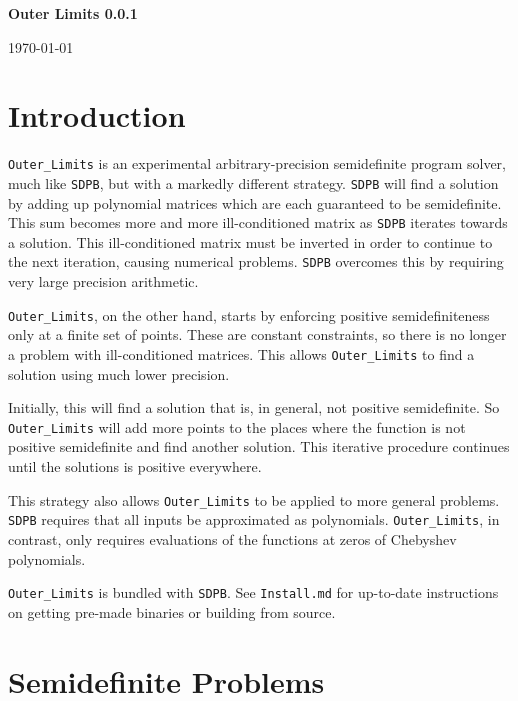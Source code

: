 \documentclass[12pt]{article}
\numberwithin{equation}{section}
\begin{document}
{\Large
\begin{center}
{\bf Outer Limits 0.0.1 \\\vspace{.1in}}
\end{center}
}
\begin{center}
\noindent \today
\end{center}
\tableofcontents
\section{Introduction}
\label{sec:introduction}

\texttt{Outer\_Limits} is an experimental arbitrary-precision
semidefinite program solver, much like \texttt{SDPB}, but with a
markedly different strategy.  \texttt{SDPB} will find a solution by
adding up polynomial matrices which are each guaranteed to be
semidefinite.  This sum becomes more and more ill-conditioned matrix
as \texttt{SDPB} iterates towards a solution.  This ill-conditioned
matrix must be inverted in order to continue to the next iteration,
causing numerical problems.  \texttt{SDPB} overcomes this by requiring
very large precision arithmetic.

\texttt{Outer\_Limits}, on the other hand, starts by enforcing positive
semidefiniteness only at a finite set of points.  These are constant
constraints, so there is no longer a problem with ill-conditioned
matrices.  This allows \texttt{Outer\_Limits} to find a solution using
much lower precision.

Initially, this will find a solution that is, in general, not positive
semidefinite.  So \texttt{Outer\_Limits} will add more points to the
places where the function is not positive semidefinite and find
another solution.  This iterative procedure continues until the
solutions is positive everywhere.

This strategy also allows \texttt{Outer\_Limits} to be applied to more
general problems.  \texttt{SDPB} requires that all inputs be
approximated as polynomials.  \texttt{Outer\_Limits}, in contrast, only requires
evaluations of the functions at zeros of Chebyshev polynomials.

\texttt{Outer\_Limits} is bundled with \texttt{SDPB}.  See
\texttt{Install.md} for up-to-date instructions on getting pre-made
binaries or building from source.

\section{Semidefinite Problems}
\label{sec:semidefinite}
\end{document}
